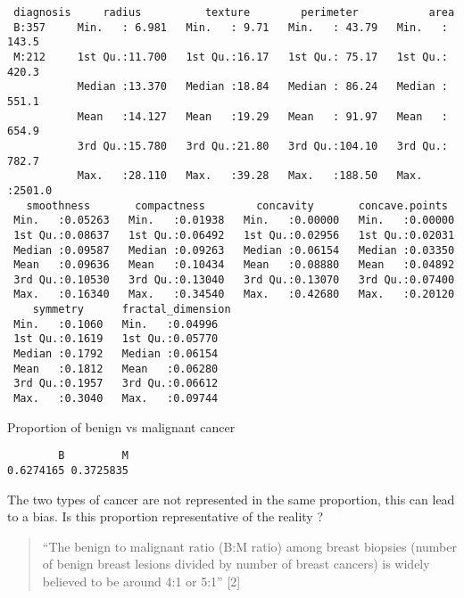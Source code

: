 \documentclass[
  11pt,
]{article}
\newenvironment{Shaded}{\begin{snugshade}}{\end{snugshade}}
\newcommand{\FunctionTok}[1]{\textcolor[rgb]{0.00,0.00,0.00}{#1}}
\newcommand{\NormalTok}[1]{#1}
\newcommand{\SpecialCharTok}[1]{\textcolor[rgb]{0.00,0.00,0.00}{#1}}
\begin{document}
\begin{verbatim}
 diagnosis     radius          texture        perimeter           area       
 B:357     Min.   : 6.981   Min.   : 9.71   Min.   : 43.79   Min.   : 143.5  
 M:212     1st Qu.:11.700   1st Qu.:16.17   1st Qu.: 75.17   1st Qu.: 420.3  
           Median :13.370   Median :18.84   Median : 86.24   Median : 551.1  
           Mean   :14.127   Mean   :19.29   Mean   : 91.97   Mean   : 654.9  
           3rd Qu.:15.780   3rd Qu.:21.80   3rd Qu.:104.10   3rd Qu.: 782.7  
           Max.   :28.110   Max.   :39.28   Max.   :188.50   Max.   :2501.0  
   smoothness       compactness        concavity       concave.points   
 Min.   :0.05263   Min.   :0.01938   Min.   :0.00000   Min.   :0.00000  
 1st Qu.:0.08637   1st Qu.:0.06492   1st Qu.:0.02956   1st Qu.:0.02031  
 Median :0.09587   Median :0.09263   Median :0.06154   Median :0.03350  
 Mean   :0.09636   Mean   :0.10434   Mean   :0.08880   Mean   :0.04892  
 3rd Qu.:0.10530   3rd Qu.:0.13040   3rd Qu.:0.13070   3rd Qu.:0.07400  
 Max.   :0.16340   Max.   :0.34540   Max.   :0.42680   Max.   :0.20120  
    symmetry      fractal_dimension
 Min.   :0.1060   Min.   :0.04996  
 1st Qu.:0.1619   1st Qu.:0.05770  
 Median :0.1792   Median :0.06154  
 Mean   :0.1812   Mean   :0.06280  
 3rd Qu.:0.1957   3rd Qu.:0.06612  
 Max.   :0.3040   Max.   :0.09744  
\end{verbatim}

Proportion of benign vs malignant cancer

\begin{Shaded}
\end{Shaded}

\begin{verbatim}
        B         M 
0.6274165 0.3725835 
\end{verbatim}

The two types of cancer are not represented in the same proportion, this
can lead to a bias. Is this proportion representative of the reality ?

\begin{quote}
``The benign to malignant ratio (B:M ratio) among breast biopsies
(number of benign breast lesions divided by number of breast cancers) is
widely believed to be around 4:1 or 5:1'' {[}2{]}
\end{quote}
\end{document}
